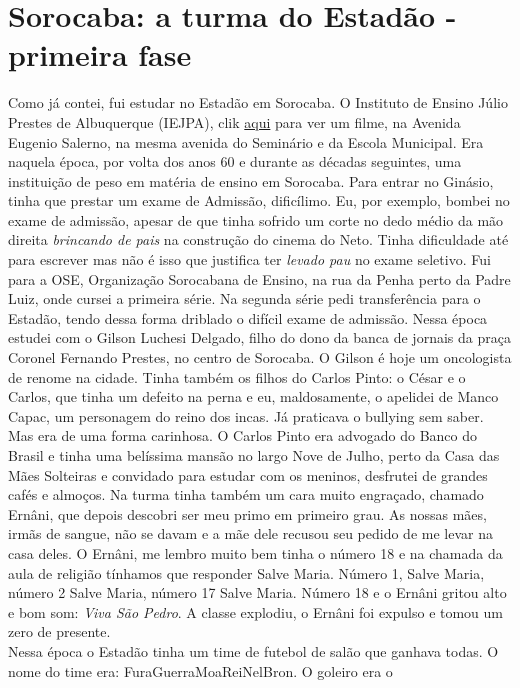 \documentclass[12pt,brazil,]{book}
\begin{document}
\section{Sorocaba: a turma do Estadão - primeira
fase}\label{sorocaba-a-turma-do-estaduxe3o---primeira-fase}

Como já contei, fui estudar no Estadão em Sorocaba. O Instituto de
Ensino Júlio Prestes de Albuquerque (IEJPA), clik
\href{Imagens/Estadao.MP4}{aqui} para ver um filme, na Avenida Eugenio
Salerno, na mesma avenida do Seminário e da Escola Municipal. Era
naquela época, por volta dos anos 60 e durante as décadas seguintes, uma
instituição de peso em matéria de ensino em Sorocaba. Para entrar no
Ginásio, tinha que prestar um exame de Admissão, dificílimo. Eu, por
exemplo, bombei no exame de admissão, apesar de que tinha sofrido um
corte no dedo médio da mão direita \emph{brincando de pais} na
construção do cinema do Neto. Tinha dificuldade até para escrever mas
não é isso que justifica ter \emph{levado pau} no exame seletivo. Fui
para a OSE, Organização Sorocabana de Ensino, na rua da Penha perto da
Padre Luiz, onde cursei a primeira série. Na segunda série pedi
transferência para o Estadão, tendo dessa forma driblado o difícil exame
de admissão. Nessa época estudei com o Gilson Luchesi Delgado, filho do
dono da banca de jornais da praça Coronel Fernando Prestes, no centro de
Sorocaba. O Gilson é hoje um oncologista de renome na cidade. Tinha
também os filhos do Carlos Pinto: o César e o Carlos, que tinha um
defeito na perna e eu, maldosamente, o apelidei de Manco Capac, um
personagem do reino dos incas. Já praticava o bullying sem saber. Mas
era de uma forma carinhosa. O Carlos Pinto era advogado do Banco do
Brasil e tinha uma belíssima mansão no largo Nove de Julho, perto da
Casa das Mães Solteiras e convidado para estudar com os meninos,
desfrutei de grandes cafés e almoços. Na turma tinha também um cara
muito engraçado, chamado Ernâni, que depois descobri ser meu primo em
primeiro grau. As nossas mães, irmãs de sangue, não se davam e a mãe
dele recusou seu pedido de me levar na casa deles. O Ernâni, me lembro
muito bem tinha o número 18 e na chamada da aula de religião tínhamos
que responder Salve Maria. Número 1, Salve Maria, número 2 Salve Maria,
número 17 Salve Maria. Número 18 e o Ernâni gritou alto e bom som:
\emph{Viva São Pedro}. A classe explodiu, o Ernâni foi expulso e tomou
um zero de presente.\\
Nessa época o Estadão tinha um time de futebol de salão que ganhava
todas. O nome do time era: FuraGuerraMoaReiNelBron. O goleiro era o
\end{document}
